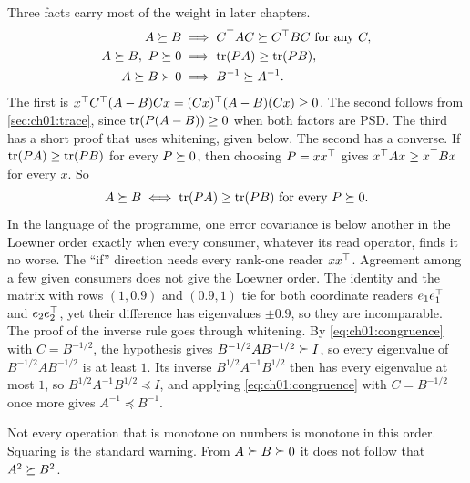Three facts carry most of the weight in later chapters.
\begin{align}
A\succeq B &\implies C^{\top} AC\succeq C^{\top} BC\ \text{for any } C, \label{eq:ch01:congruence}\\
A\succeq B,\ P\succeq 0 &\implies \operatorname{tr}(PA)\ge\operatorname{tr}(PB), \label{eq:ch01:tracemono}\\
A\succeq B\succ 0 &\implies B^{-1}\succeq A^{-1}. \label{eq:ch01:inversemono}
\end{align}
The first is $x^{\top} C^{\top}(A-B)Cx=(Cx)^{\top}(A-B)(Cx)\ge0$. The second follows from
\cref{sec:ch01:trace}, since $\operatorname{tr}(P(A-B))\ge0$ when both factors are PSD. The
third has a short proof that uses whitening, given below. The second has a
converse. If $\operatorname{tr}(PA)\ge\operatorname{tr}(PB)$ for every $P\succeq0$, then choosing $P=xx^{\top}$
gives $x^{\top} Ax\ge x^{\top} Bx$ for every $x$. So
\begin{equation}\label{eq:ch01:everyreader}
A\succeq B\iff \operatorname{tr}(PA)\ge\operatorname{tr}(PB)\ \text{for every } P\succeq0 .
\end{equation}
In the language of the programme, one error covariance is below another in
the Loewner order exactly when every consumer, whatever its read operator,
finds it no worse. The ``if'' direction needs every rank-one reader $xx^{\top}$.
Agreement among a few given consumers does not give the Loewner order. The
identity and the matrix with rows $(1,0.9)$ and $(0.9,1)$ tie for both
coordinate readers $e_1e_1^{\top}$ and $e_2e_2^{\top}$, yet their difference has
eigenvalues $\pm0.9$, so they are incomparable.
The proof of the inverse rule goes through whitening. By \cref{eq:ch01:congruence} with
$C=B^{-1/2}$, the hypothesis gives $B^{-1/2}AB^{-1/2}\succeq I$, so every
eigenvalue of $B^{-1/2}AB^{-1/2}$ is at least $1$. Its inverse
$B^{1/2}A^{-1}B^{1/2}$ then has every eigenvalue at most $1$, so
$B^{1/2}A^{-1}B^{1/2}\preceq I$, and applying \cref{eq:ch01:congruence} with
$C=B^{-1/2}$ once more gives $A^{-1}\preceq B^{-1}$.

Not every operation that is monotone on numbers is monotone in this order.
Squaring is the standard warning. From $A\succeq B\succeq 0$ it does not follow that
$A^2\succeq B^2$.

